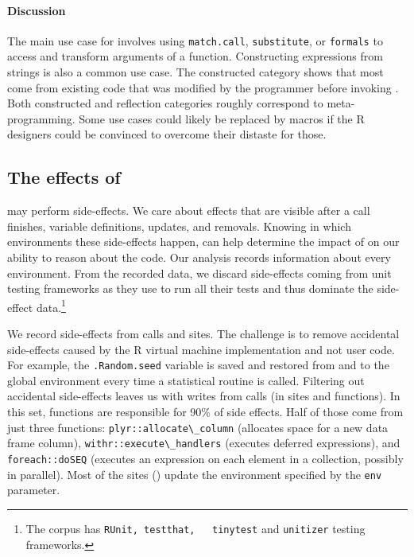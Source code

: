 \documentclass[screen,acmsmall]{acmart}%
\renewcommand{\k}[1]{\lstinline |#1|\xspace}
\begin{document}
\paragraph{Discussion}
The main use case for \eval involves using \k{match.call}, \k{substitute}, or
\k{formals} to access and transform arguments of a function. Constructing
expressions from strings is also a common use case. The constructed category
shows that most \evals come from existing code that was modified by the
programmer before invoking \eval. Both constructed and reflection categories
roughly correspond to meta-programming. Some use cases could likely be replaced
by macros if the R designers could be convinced to overcome their distaste for
those.

\subsection{The effects of \eval}

\Eval may perform side-effects. We care about effects that are visible after a
call finishes, \ie variable definitions, updates, and removals. Knowing in which
environments these side-effects happen, can help determine the impact of \eval
on our ability to reason about the code. Our analysis records information about
every environment. From the recorded data, we discard side-effects coming from
unit testing frameworks as they use \eval to run all their tests and thus
dominate the side-effect data.\footnote{The corpus has \k{RUnit, testthat,
  tinytest} and \k{unitizer} testing frameworks.}

We record \SEAllRnd side-effects from \SEAllCallsRnd calls and \SEAllSites
sites. The challenge is to remove accidental side-effects caused by the R
virtual machine implementation and not user code. For example, the
\k{.Random.seed} variable is saved and restored from and to the global
environment every time a statistical routine is called. Filtering out accidental
side-effects leaves us with \SEUserRnd writes from \SEUserCallsRnd calls (in
\SEUserSites sites and \SEUserFunctions functions). In this set, \SEFunsNighty functions are
responsible for 90\% of side effects. Half of those come from just three
functions: \k{plyr::allocate\_column} (allocates space for a new data frame
column), \k{withr::execute\_handlers} (executes deferred expressions), and
\k{foreach::doSEQ} (executes an expression on each element in a collection,
possibly in parallel). Most of the sites (\SESitesInEnvirRatio) update
the environment specified by the \k{env} parameter.
\end{document}
